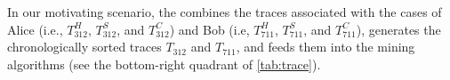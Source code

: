 In our motivating scenario, the  combines the traces associated with the cases of Alice (i.e., $T^H_{312}$, $T^S_{312}$, and $T^C_{312}$) and Bob (i.e, $T^H_{711}$, $T^S_{711}$, and $T^C_{711}$), generates the chronologically sorted traces $T_{312}$ and $T_{711}$, and feeds them into the mining algorithms (see the bottom-right quadrant of \cref{tab:trace}).



